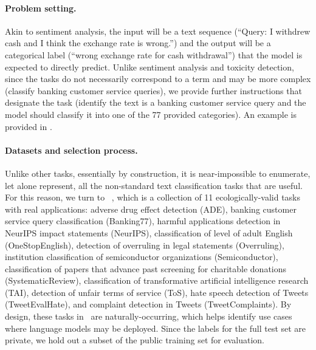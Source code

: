 
\paragraph{Problem setting.}
Akin to sentiment analysis, the input will be a text sequence (\eg ``Query: I withdrew cash and I think the exchange rate is wrong.'') and the output will be a categorical label (``wrong exchange rate for cash withdrawal'') that the model is expected to directly predict.  
Unlike sentiment analysis and toxicity detection, since the tasks do not necessarily correspond to a term and may be more complex (\eg classify banking customer service queries), we provide further instructions that designate the task (\eg identify the text is a banking customer service query and the model should classify it into one of the 77 provided categories). 
An example is provided in .

\paragraph{Datasets and selection process.} 
Unlike other tasks, essentially by construction, it is near-impossible to enumerate, let alone represent, all the non-standard text classification tasks that are useful.
For this reason, we turn to \raft~\citep{alex2021raft}, which is a collection of 11 ecologically-valid tasks with real applications: adverse drug effect detection (ADE), banking customer service query classification (Banking77), harmful applications detection in NeurIPS impact statements (NeurIPS), classification of level of adult English (OneStopEnglish), detection of overruling in legal statements (Overruling), institution classification of semiconductor organizations (Semiconductor), classification of papers that advance past screening for charitable donations (SystematicReview), classification of transformative artificial intelligence research (TAI), detection of unfair terms of service (ToS), hate speech detection of Tweets (TweetEvalHate), and complaint detection in Tweets (TweetComplaints). 
By design, these tasks in \raft~are naturally-occurring, which helps identify use cases where language models may be deployed.
Since the labels for the full test set are private, we hold out a subset of the public training set for evaluation.